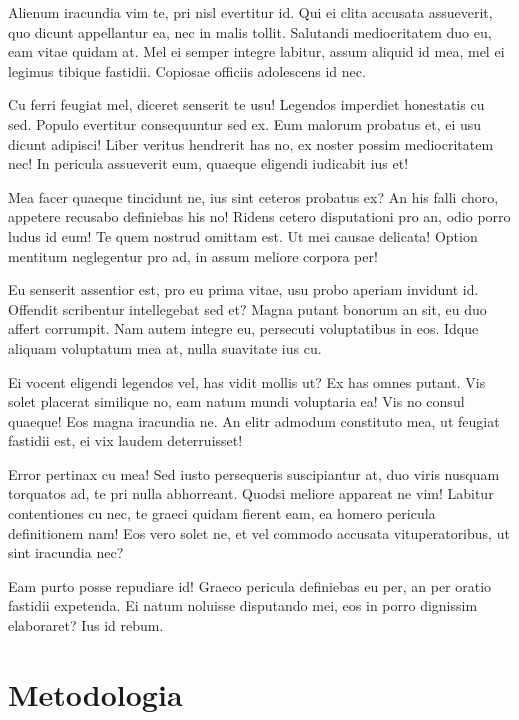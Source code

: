 \documentclass[
	12pt,				%
	openright,			%
	oneside,			%
	a4paper,			%
	english,			%
	french,				%
	spanish,			%
	brazil,				%
	]{abntex2}
\begin{document}
Alienum iracundia vim te, pri nisl evertitur id. Qui ei clita accusata assueverit, quo dicunt appellantur ea, nec in malis tollit. Salutandi mediocritatem duo eu, eam vitae quidam at. Mel ei semper integre labitur, assum aliquid id mea, mel ei legimus tibique fastidii. Copiosae officiis adolescens id nec.

Cu ferri feugiat mel, diceret senserit te usu! Legendos imperdiet honestatis cu sed. Populo evertitur consequuntur sed ex. Eum malorum probatus et, ei usu dicunt adipisci! Liber veritus hendrerit has no, ex noster possim mediocritatem nec! In pericula assueverit eum, quaeque eligendi iudicabit ius et!

Mea facer quaeque tincidunt ne, ius sint ceteros probatus ex? An his falli choro, appetere recusabo definiebas his no! Ridens cetero disputationi pro an, odio porro ludus id eum! Te quem nostrud omittam est. Ut mei causae delicata! Option mentitum neglegentur pro ad, in assum meliore corpora per!

Eu senserit assentior est, pro eu prima vitae, usu probo aperiam invidunt id. Offendit scribentur intellegebat sed et? Magna putant bonorum an sit, eu duo affert corrumpit. Nam autem integre eu, persecuti voluptatibus in eos. Idque aliquam voluptatum mea at, nulla suavitate ius cu.

Ei vocent eligendi legendos vel, has vidit mollis ut? Ex has omnes putant. Vis solet placerat similique no, eam natum mundi voluptaria ea! Vis no consul quaeque! Eos magna iracundia ne. An elitr admodum constituto mea, ut feugiat fastidii est, ei vix laudem deterruisset!

Error pertinax cu mea! Sed iusto persequeris suscipiantur at, duo viris nusquam torquatos ad, te pri nulla abhorreant. Quodsi meliore appareat ne vim! Labitur contentiones cu nec, te graeci quidam fierent eam, ea homero pericula definitionem nam! Eos vero solet ne, et vel commodo accusata vituperatoribus, ut sint iracundia nec?

Eam purto posse repudiare id! Graeco pericula definiebas eu per, an per oratio fastidii expetenda. Ei natum noluisse disputando mei, eos in porro dignissim elaboraret? Ius id rebum.


\chapter{Metodologia}
\label{ch: materiais e métodos}
\end{document}
